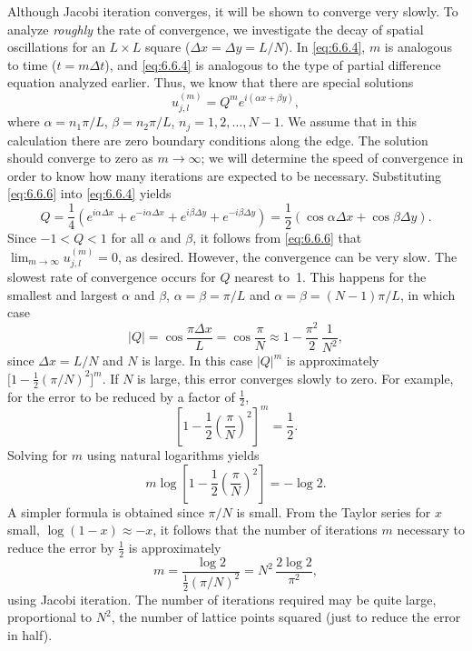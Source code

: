 Although Jacobi iteration converges, it will be shown to converge very slowly.  To analyze \emph{roughly} the rate of convergence, we investigate the decay of spatial oscillations for an $L \times L$ square ($\Delta x = \Delta y = L/N$).  In \eqref{eq:6.6.4}, $m$ is analogous to time ($t = m\Delta t$), and \eqref{eq:6.6.4} is analogous to the type of partial difference equation analyzed earlier.  Thus, we know that there are special solutions
\begin{equation}
u_{j,l}^{(m)} = Q^m e^{i(\alpha x + \beta y)},
\label{eq:6.6.6}
\end{equation}
where $\alpha = n_1\pi/L$, $\beta = n_2\pi/L$, $n_j = 1, 2, \ldots, N-1$.  We assume that in this calculation there are zero boundary conditions along the edge.  The solution should converge to zero as $m \to \infty$; we will determine the speed of convergence in order to know how many iterations are expected to be necessary.  Substituting \eqref{eq:6.6.6} into \eqref{eq:6.6.4} yields
\[
Q = \frac{1}{4}\left(e^{i\alpha\Delta x} + e^{-i\alpha\Delta x} + e^{i\beta\Delta y} + e^{-i\beta\Delta y}\right) = \frac{1}{2}(\cos\alpha\Delta x + \cos\beta\Delta y).
\]
Since $-1 < Q < 1$ for all $\alpha$ and $\beta$, it follows from \eqref{eq:6.6.6} that $\lim_{m\to\infty}u_{j,l}^{(m)} = 0$, as desired.  However, the convergence can be very slow.  The slowest rate of convergence occurs for $Q$ nearest to~1.  This happens for the smallest and largest $\alpha$ and $\beta$, $\alpha = \beta = \pi/L$ and $\alpha = \beta = (N-1)\pi/L$, in which case
\begin{equation}
|Q| = \cos\frac{\pi\Delta x}{L} = \cos\frac{\pi}{N} \approx 1 - \frac{\pi^2}{2}\,\frac{1}{N^2},
\label{eq:6.6.7}
\end{equation}
since $\Delta x = L/N$ and $N$ is large.  In this case $|Q|^m$ is approximately $\bigl[1 - \frac{1}{2}(\pi/N)^2\bigr]^m$.  If $N$ is large, this error converges slowly to zero.  For example, for the error to be reduced by a factor of $\frac{1}{2}$,
\[
\left[1 - \frac{1}{2}\left(\frac{\pi}{N}\right)^2\right]^m = \frac{1}{2}.
\]
Solving for $m$ using natural logarithms yields
\[
m\log\left[1 - \frac{1}{2}\left(\frac{\pi}{N}\right)^2\right] = -\log 2.
\]
A simpler formula is obtained since $\pi/N$ is small.  From the Taylor series for $x$ small, $\log(1 - x) \approx -x$, it follows that the number of iterations $m$ necessary to reduce the error by $\frac{1}{2}$ is approximately
\[
m = \frac{\log 2}{\frac{1}{2}(\pi/N)^2} = N^2\,\frac{2\log 2}{\pi^2},
\]
using Jacobi iteration.  The number of iterations required may be quite large, proportional to $N^2$, the number of lattice points squared (just to reduce the error in half).

